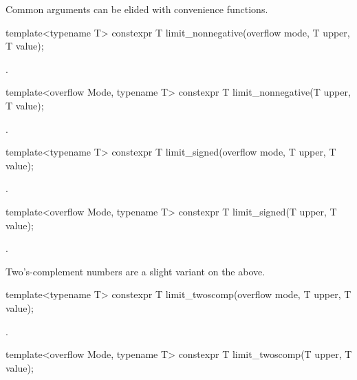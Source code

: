 \begin{addedblock}
Common arguments can be elided with convenience functions.

\begin{itemdecl}
template<typename T>
constexpr T limit_nonnegative(overflow mode, T upper, T value);
\end{itemdecl}

\begin{itemdescr}
\returns {}.
\end{itemdescr}

\begin{itemdecl}
template<overflow Mode, typename T>
constexpr T limit_nonnegative(T upper, T value);
\end{itemdecl}

\begin{itemdescr}
\returns {}.
\end{itemdescr}

\begin{itemdecl}
template<typename T>
constexpr T limit_signed(overflow mode, T upper, T value);
\end{itemdecl}

\begin{itemdescr}
\returns {}.
\end{itemdescr}

\begin{itemdecl}
template<overflow Mode, typename T>
constexpr T limit_signed(T upper, T value);
\end{itemdecl}

\begin{itemdescr}
\returns {}.
\end{itemdescr}

Two's-complement numbers are a slight variant on the above.

\begin{itemdecl}
template<typename T>
constexpr T limit_twoscomp(overflow mode, T upper, T value);
\end{itemdecl}

\begin{itemdescr}
\returns {}.
\end{itemdescr}

\begin{itemdecl}
template<overflow Mode, typename T>
constexpr T limit_twoscomp(T upper, T value);
\end{itemdecl}


\end{addedblock}
